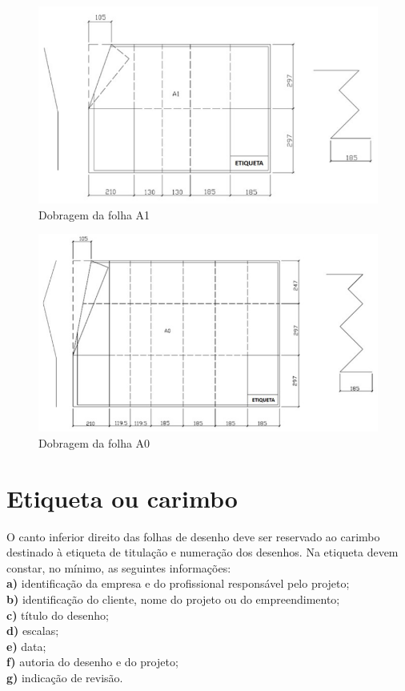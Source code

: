 \documentclass{article}
\begin{document}
\begin{figure} [H] %
\centering
\includegraphics[scale=0.8]{Fig/Figura_DobragemFolhaA1.png} 
\caption{Dobragem da folha A1}
\label{fig_DobragemDaFolhaA1}
\end{figure}

\begin{figure} [H] %
\centering
\includegraphics[scale=0.8]{Fig/Figura_DobragemFolhaA0.png} 
\caption{Dobragem da folha A0}
\label{fig_DobragemDaFolhaA0}
\end{figure}

\section{Etiqueta ou carimbo}

\hspace{1cm} O canto inferior direito das folhas de desenho deve ser reservado ao carimbo destinado à etiqueta de titulação e numeração dos desenhos. Na etiqueta devem constar, no mínimo, as seguintes informações:\\[0.3cm]
\textbf{a)} identificação da empresa e do profissional responsável pelo projeto;\\
\textbf{b)} identificação do cliente, nome do projeto ou do empreendimento;\\
\textbf{c)} título do desenho;\\
\textbf{d)} escalas;\\
\textbf{e)} data;\\
\textbf{f)} autoria do desenho e do projeto;\\
\textbf{g)} indicação de revisão.\\
\end{document}
